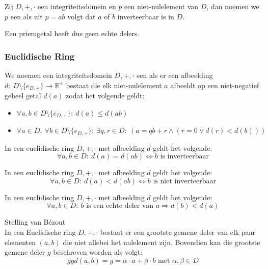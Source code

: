 \documentclass[main.tex]{subfiles}
\begin{document}
\begin{de}
  Zij $D,+,\cdot$ een integriteitsdomein en $p$ een niet-nulelement van $D$, dan noemen we $p$ een  als uit $p=ab$ volgt dat $a$ of $b$ inverteerbaar is in $D$.
\end{de}

\begin{opm}
  Een priemgetal heeft dus geen echte delers.
\end{opm}

\subsubsection{Euclidische Ring}
\label{sec:euclidische-ring}

\begin{de}
  We noemen een integriteitsdomein $D,+,\cdot$ een  als er een afbeelding $d:\ D\setminus \{e_{D,+}\} \rightarrow \mathbb{R}^{+}$ bestaat die elk niet-nulelement $a$ afbeeldt op een niet-negatief geheel getal $d(a)$ zodat het volgende geldt:
\begin{itemize}
\item $\forall a,b \in D\setminus \{e_{D,+}\}:\ d(a) \le d(ab)$
\item $\forall a \in D,\ \forall b\in D\setminus \{e_{D,+}\}:\ \exists q,r \in D:\ (a = qb+r \wedge (r=0 \vee d(r) < d(b)))$
\end{itemize}
\end{de}

\begin{st}
  In een euclidische ring $D,+,\cdot$ met afbeelding $d$ geldt het volgende:
  \[ \forall a,b \in D:\ d(a) = d(ab) \Leftrightarrow b \text{ is inverteerbaar} \]
\end{st}

\begin{st}
  In een euclidische ring $D,+,\cdot$ met afbeelding $d$ geldt het volgende:
  \[ \forall a,b \in D:\ d(a) < d(ab) \Leftrightarrow b \text{ is niet inverteerbaar} \]
\end{st}

\begin{st}
  In een euclidische ring $D,+,\cdot$ met afbeelding $d$ geldt het volgende:
  \[ \forall a,b \in D:\ b \text{ is een echte deler van } a \Rightarrow d(b) < d(a) \]
\end{st}

\begin{st}
  Stelling van B\'ezout\\
  In een Euclidische ring $D,+,\cdot$ bestaat er een grootste gemene deler van elk paar elementen $(a,b)$ die niet allebei het nulelement zijn.
  Bovendien kan die grootste gemene deler $g$ beschreven worden als volgt:
  \[ ggd(a,b) = g = \alpha \cdot a + \beta \cdot b \text{ met }\alpha,\beta \in D \]
\end{st}
\end{document}
